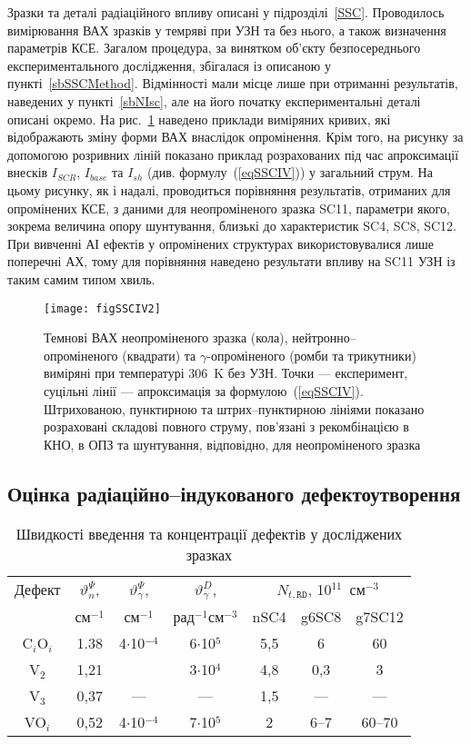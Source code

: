 Зразки та деталі радіаційного впливу описані у підрозділі~\ref{SSC}.
Проводилось вимірювання ВАХ зразків у темряві при УЗН та без нього, а також визначення параметрів КСЕ.
Загалом процедура, за винятком об'єкту безпосереднього експериментального дослідження,
збігалася із описаною у пункті~\ref{sbSSCMethod}.
Відмінності мали місце лише при отриманні результатів, наведених у пункті~\ref{sbNIsc},
але на його початку експериментальні деталі описані окремо.
На рис.~\ref{figSSCIV2} наведено приклади виміряних кривих, які відображають
зміну форми ВАХ внаслідок опромінення.
Крім того, на рисунку за допомогою розривних ліній показано приклад розрахованих під час апроксимації внесків $I_{SCR}$, $I_{base}$ та $I_{sh}$
(див. формулу~(\ref{eqSSCIV})) у загальний струм.
На цьому рисунку, як і надалі, проводиться порівняння результатів,
отриманих для опромінених КСЕ, з даними для неопроміненого зразка SC11, параметри якого, зокрема величина  опору шунтування,
близькі до характеристик SC4, SC8, SC12.
При вивченні АІ ефектів у опромінених структурах використовувалися лише поперечні АХ,
тому для порівняння наведено результати впливу на SC11 УЗН із таким самим типом хвиль.

\begin{figure}
\center
\texttt{[image: figSSCIV2]}%
\caption{\label{figSSCIV2}
Темнові ВАХ неопроміненого зразка (кола), нейтронно--опроміненого (квадрати) та $\gamma$-опроміненого (ромби та трикутники) виміряні при температурі 306~K без УЗН.
Точки --- експеримент, суцільні лінії --- апроксимація за формулою~(\ref{eqSSCIV}).
Штрихованою, пунктирною та штрих--пунктирною лініями показано розраховані складові повного струму, пов'язані з рекомбінацією в КНО, в ОПЗ та шунтування, відповідно,
для неопроміненого зразка
}%
\end{figure}



\subsection{Оцінка радіаційно--індукованого дефектоутворення\label{sbRadDefCreate}}

\begin{table}
\caption{\label{tabDefectNt}Швидкості введення та концентрації дефектів у досліджених зразках
}
\center
\begin{tabular}{|c|c|c|c|c|c|c|}
\hline
Дефект&$\vartheta_n^{\Psi}$,  &$\vartheta_\gamma^{\Psi}$,&$\vartheta_\gamma^D$,&\multicolumn{3}{c|}{$N_{t,\mathtt{RD}}$, 10$^{11}$~см$^{-3}$}\\
\cline{5-7}
&см$^{-1}$ \cite{Moll:PhD}&см$^{-1}$ \cite{gamma:Kolkr}&рад$^{-1}$см$^{-3}$ \cite{gamma:Stahl}&nSC4&g6SC8&g7SC12\\
\hline
C$_i$O$_i$&1.38&4$\cdot$10$^{-4}$&6$\cdot$10$^5$&5,5&6&60\\ \hline
V$_2$&1,21&&3$\cdot$10$^4$&4,8&0,3&3\\ \hline
V$_3$&0,37&---&---&1,5&---&---\\ \hline
VO$_i$&0,52&4$\cdot$10$^{-4}$&7$\cdot$10$^5$&2&6--7&60--70\\\hline
\end{tabular}
\end{table}

